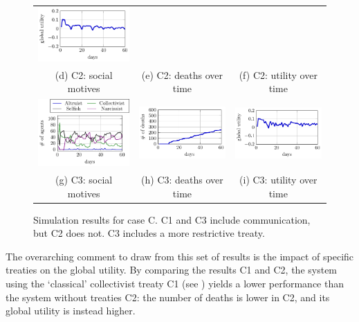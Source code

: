 \begin{figure}[htb]
\begin{tabular}{ccc}
    \includegraphics[width=0.3\linewidth]{008_team_6_agent_design/C/C4_utility.pdf}\\[0pt]
    (d) C2: social motives & (e) C2: deaths over time & (f) C2: utility over time \\[8pt]
    \includegraphics[width=0.3\linewidth]{008_team_6_agent_design/C/C5_SM.pdf} &   \includegraphics[width=0.3\linewidth]{008_team_6_agent_design/C/C5_deaths.pdf} &
    \includegraphics[width=0.3\linewidth]{008_team_6_agent_design/C/C5_utility.pdf}\\[0pt]
    (g) C3: social motives & (h) C3: deaths over time & (i) C3: utility over time \\[8pt]
    \end{tabular}
    \caption{Simulation results for case C. C1 and C3 include communication, but C2 does not. C3 includes a more restrictive treaty.}
    \label{fig:res_C}%
\end{figure}





The overarching comment to draw from this set of results is the impact of specific treaties on the global utility. By comparing the results C1 and C2, the system using the `classical' collectivist treaty C1 (see ) yields a lower performance than the system without treaties C2: the number of deaths is lower in C2, and its global utility is instead higher.

